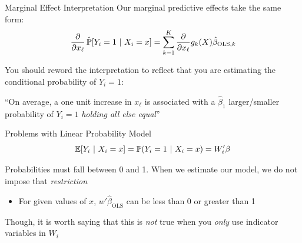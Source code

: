 \documentclass[aspectratio=169,t,11pt,table]{beamer}
\begin{document}
\begin{frame}{Marginal Effect Interpretation}
  Our marginal predictive effects take the same form:
  $$
    \frac{\partial}{\partial x_\ell} \probhat{Y_i = 1}{X_i = x} = \sum_{k=1}^K \frac{\partial}{\partial x_\ell} g_{k}(X) \hat{\beta}_{\text{OLS}, k}
  $$
  
  \bigskip
  You should reword the interpretation to reflect that you are estimating the conditional probability of $Y_i = 1$:

  \begin{tcolorbox}[boxrule = 0pt, frame hidden, sharp corners, enhanced, borderline west = {2pt}{0pt}{zinc600}, interior hidden]
    ``On average, a one unit increase in $x_\ell$ is associated with a $\hat{\beta}_1$ larger/smaller probability of $Y_i = 1$ \emph{\color{blue} holding all else equal}''
  \end{tcolorbox}
\end{frame}

\begin{frame}{Problems with Linear Probability Model}
  \vspace*{-\bigskipamount}
  $$
    \expec{Y_i}{X_i = x} = \prob{Y_i = 1}{X_i = x} = W_i' \beta
  $$

  \bigskip
  Probabilities must fall between 0 and 1. When we estimate our model, we do not impose that \emph{restriction}
  \begin{itemize}
    \item For given values of $x$, $w' \hat{\beta}_{\text{OLS}}$ can be less than 0 or greater than 1
  \end{itemize}

  \bigskip
  Though, it is worth saying that this is \emph{not} true when you \emph{only} use indicator variables in $W_i$
\end{frame}
\end{document}
